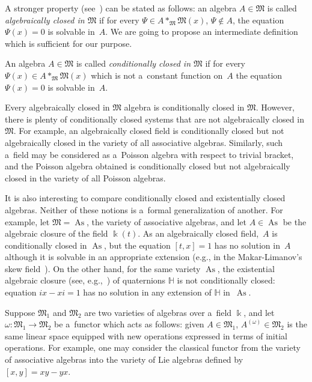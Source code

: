 A stronger property (see~\cite{Bokut66}) can be stated as follows: an algebra $A\in \mathfrak M$ is called {\em
algebraically closed in $\mathfrak M$} if for every $\Psi \in A*_{\mathfrak M} {\mathfrak M}(x)$, $\Psi\notin A$, the
equation $\Psi(x)=0$ is solvable in~$A$.
We are going to propose an intermediate def\/inition which is suf\/f\/icient for our purpose.

\begin{definition}
An algebra $A\in \mathfrak M$ is called {\em conditionally closed in $\mathfrak M$} if for every $\Psi(x)\in
A*_{\mathfrak M} {\mathfrak M}(x)$ which is not a~constant function on~$A$ the equation $\Psi(x)=0$ is solvable in~$A$.
\end{definition}

Every algebraically closed in $\mathfrak M$ algebra is conditionally closed in $\mathfrak M$.
However, there is plenty of conditionally closed systems that are not algebraically closed in $\mathfrak M$.
For example, an algebraically closed f\/ield is conditionally closed but not algebraically closed in the variety of all
associative algebras.
Similarly, such a~f\/ield may be considered as a~Poisson algebra with respect to trivial bracket, and the Poisson algebra
obtained is conditionally closed but not algebraically closed in the variety of all Poisson algebras.

It is also interesting to compare conditionally closed and existentially closed algebras.
Neither of these notions is a~formal generalization of another.
For example, let $\mathfrak M=\operatorname{As}$, the variety of associative algebras, and let $A\in \operatorname{As}$ be the algebraic closure of
the f\/ield $\Bbbk(t)$.
As an algebraically closed f\/ield,~$A$ is conditionally closed in $\operatorname{As}$, but the equation $[t,x]=1$ has no solution in~$A$
although it is solvable in an appropriate extension (e.g., in the Makar-Limanov's skew f\/ield~\cite{LML85}).
On the other hand, for the same variety $\operatorname{As}$, the existential algebraic closure (see, e.g.,~\cite[Chapter~III]{Cherlin})
of quaternions $\mathbb H$ is not conditionally closed: equation $ix-xi=1$ has no solution in any extension of $\mathbb
H$ in~$\operatorname{As}$.

Suppose $\mathfrak M_1$ and $\mathfrak M_2$ are two varieties of algebras over a~f\/ield $\Bbbk $, and let $\omega:
\mathfrak M_1 \to \mathfrak M_2$ be a~functor which acts as follows: given $A\in \mathfrak M_1$, $A^{(\omega)}\in
\mathfrak M_2$ is the same linear space equipped with new operations expressed in terms of initial operations.
For example, one may consider the classical functor from the variety of associative algebras into the variety of Lie
algebras def\/ined by $[x,y] = xy-yx$.

